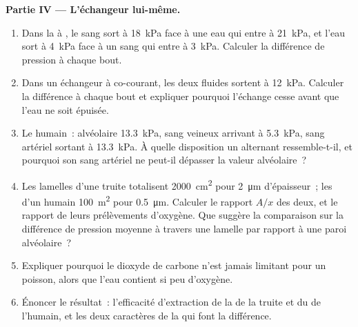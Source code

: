 \begin{problem}
\medskip
\noindent\textbf{Partie IV --- L'échangeur lui-même.}
\begin{enumerate}[resume]
  \item Dans la  à , le sang sort à
        \qty{18}{kPa} face à une eau qui entre à \qty{21}{kPa}, et
        l'eau sort à \qty{4}{kPa} face à un sang qui entre à
        \qty{3}{kPa}. Calculer la différence de pression à chaque bout.
  \item Dans un échangeur à co-courant, les deux fluides sortent à
        \qty{12}{kPa}. Calculer la différence à chaque bout et
        expliquer pourquoi l'échange cesse avant que l'eau ne soit
        épuisée.
  \item Le  humain~: alvéolaire \qty{13.3}{kPa}, sang veineux
        arrivant à \qty{5.3}{kPa}, sang artériel sortant à
        \qty{13.3}{kPa}. À quelle disposition un  alternant
        ressemble-t-il, et pourquoi son sang artériel ne peut-il
        dépasser la valeur alvéolaire~?
  \item Les lamelles d'une truite totalisent \qty{2000}{cm^2} pour
        \qty{2}{\micro m} d'épaisseur~; les  d'un humain
        \qty{100}{m^2} pour \qty{0.5}{\micro m}. Calculer le rapport
        $A/x$ des deux, et le rapport de leurs prélèvements d'oxygène.
        Que suggère la comparaison sur la différence de pression
        moyenne à travers une lamelle par rapport à une paroi
        alvéolaire~?
  \item Expliquer pourquoi le dioxyde de carbone n'est jamais limitant
        pour un poisson, alors que l'eau contient si peu d'oxygène.
  \item Énoncer le résultat~: l'efficacité d'extraction de la 
        de la truite et du  de l'humain, et les deux caractères
        de la  qui font la différence.
\end{enumerate}
\end{problem}
